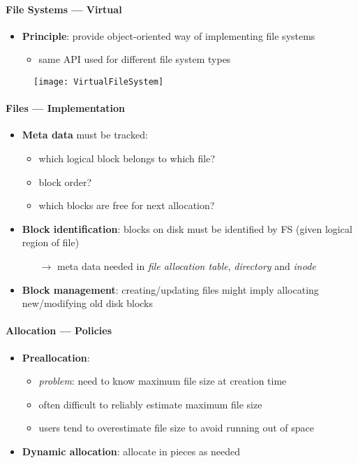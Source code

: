 \paragraph{File Systems --- Virtual}
\begin{itemize}
  \item \textbf{Principle}: provide object-oriented way of implementing file systems
  \begin{itemize}
    \item same API used for different file system types
  \end{itemize}
\end{itemize}
\begin{figure}[h]\centering\label{VirtualFileSystem}\texttt{[image: VirtualFileSystem]}\end{figure}

\paragraph{Files --- Implementation}
\begin{itemize}
  \item \textbf{Meta data} must be tracked:
  \begin{itemize}
    \item which logical block belongs to which file?
    \item block order?
    \item which blocks are free for next allocation?
  \end{itemize}
  \item \textbf{Block identification}: blocks on disk must be identified by FS (given logical region of file)
  \begin{itemize}
    \item[$ \to $] meta data needed in \emph{file allocation table}, \emph{directory} and \emph{inode}
  \end{itemize}
  \item \textbf{Block management}: creating/updating files might imply allocating new/modifying old disk blocks
\end{itemize}

\paragraph{Allocation --- Policies}
\begin{itemize}
  \item \textbf{Preallocation}:
  \begin{itemize}
    \item \emph{problem}: need to know maximum file size at creation time
    \item often difficult to reliably estimate maximum file size
    \item users tend to overestimate file size to avoid running out of space
  \end{itemize}
  \item \textbf{Dynamic allocation}: allocate in pieces as needed
\end{itemize}

